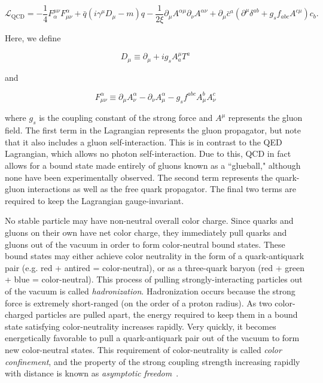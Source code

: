 \begin{equation}
\mathcal{L}_{\text{QCD}} = -\frac{1}{4}F^{\mu\nu}_{\alpha}F^{\alpha}_{\mu\nu} + \bar{q}\left(i\gamma^{\mu}D_{\mu} - m\right)q - \frac{1}{2\xi}\partial_{\mu}A^{\alpha\mu}\partial_{\nu}A^{\alpha\nu} + \partial_{\mu}\bar{c}^{a}\left(\partial^{\mu}\delta^{ab} + g_{s}f_{abc}A^{c\mu}\right)c_{b}.
\end{equation}\cite{halzen}

\noindent Here, we define

\begin{equation}
D_{\mu} \equiv \partial_{\mu} + ig_{s}A^{\mu}_{a}T^{a}
\end{equation}

\noindent and

\begin{equation}
F^{\alpha}_{\mu\nu} \equiv \partial_{\mu}A^{\alpha}_{\nu} - \partial_{\nu}A^{\alpha}_{\mu} - g_{s}f^{abc}A^{b}_{\mu}A^{c}_{\nu}
\end{equation}

\noindent where $g_{s}$ is the coupling constant of the strong force and $A^{\mu}$ represents the gluon field. The first term in the Lagrangian represents the gluon propagator, but note that it also includes a gluon self-interaction. This is in contrast to the QED Lagrangian, which allows no photon self-interaction. Due to this, QCD in fact allows for a bound state made entirely of gluons known as a ``glueball," although none have been experimentally observed. The second term represents the quark-gluon interactions as well as the free quark propagator. The final two terms are required to keep the Lagrangian gauge-invariant.

No stable particle may have non-neutral overall color charge. Since quarks and gluons on their own have net color charge, they immediately pull quarks and gluons out of the vacuum in order to form color-neutral bound states. These bound states may either achieve color neutrality in the form of a quark-antiquark pair (e.g. red + antired = color-neutral), or as a three-quark baryon (red + green + blue = color-neutral). This process of pulling strongly-interacting particles out of the vacuum is called \textit{hadronization}. Hadronization occurs because the strong force is extremely short-ranged (on the order of a proton radius). As two color-charged particles are pulled apart, the energy required to keep them in a bound state satisfying color-neutrality increases rapidly. Very quickly, it becomes energetically favorable to pull a quark-antiquark pair out of the vacuum to form new color-neutral states. This requirement of color-neutrality is called \textit{color confinement}, and the property of the strong coupling strength increasing rapidly with distance is known as \textit{asymptotic freedom}~\cite{halzen}.


